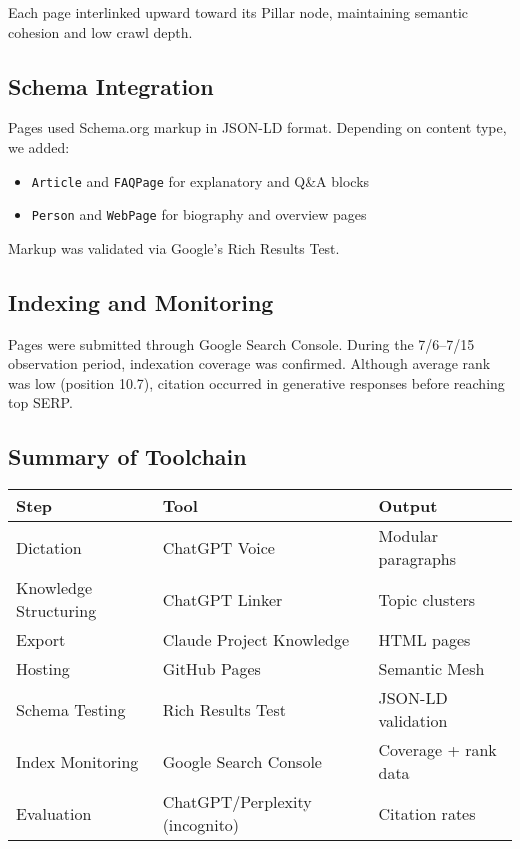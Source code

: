 Each page interlinked upward toward its Pillar node, maintaining semantic cohesion and low crawl depth.

\subsection{Schema Integration}

Pages used Schema.org markup in JSON-LD format. Depending on content type, we added:
\begin{itemize}
  \item \texttt{Article} and \texttt{FAQPage} for explanatory and Q\&A blocks
  \item \texttt{Person} and \texttt{WebPage} for biography and overview pages
\end{itemize}

Markup was validated via Google’s Rich Results Test.

\subsection{Indexing and Monitoring}

Pages were submitted through Google Search Console. During the 7/6--7/15 observation period, indexation coverage was confirmed. Although average rank was low (position 10.7), citation occurred in generative responses before reaching top SERP.

\subsection{Summary of Toolchain}

\begin{center}
\begin{tabular}{|l|l|l|}
\hline
\textbf{Step} & \textbf{Tool} & \textbf{Output} \\\hline
Dictation & ChatGPT Voice & Modular paragraphs \\\hline
Knowledge Structuring & ChatGPT Linker & Topic clusters \\\hline
Export & Claude Project Knowledge & HTML pages \\\hline
Hosting & GitHub Pages & Semantic Mesh \\\hline
Schema Testing & Rich Results Test & JSON-LD validation \\\hline
Index Monitoring & Google Search Console & Coverage + rank data \\\hline
Evaluation & ChatGPT/Perplexity (incognito) & Citation rates \\\hline
\end{tabular}
\end{center}


